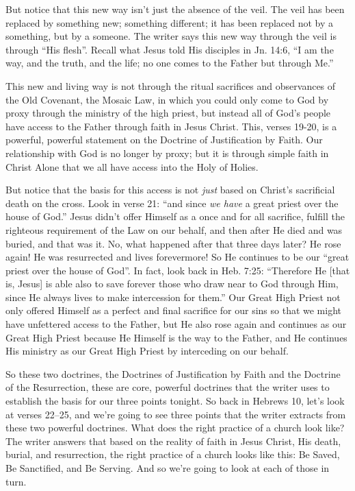 \documentclass[letterpaper, 12pt]{article}
\begin{document}
    But notice that this new way isn't just the absence of the veil. The
    veil has been replaced by something new; something different; it has
    been replaced not by a something, but by a someone. The writer says
    this new way through the veil is through ``His flesh''. Recall what
    Jesus told His disciples in Jn. 14:6, ``I am the way, and the truth,
    and the life; no one comes to the Father but through Me.''

    This new and living way is not through the ritual sacrifices and
    observances of the Old Covenant, the Mosaic Law, in which you could
    only come to God by proxy through the ministry of the high priest,
    but instead all of God's people have access to the Father through
    faith in Jesus Christ. This, verses 19-20, is a powerful, powerful
    statement on the Doctrine of Justification by Faith. Our
    relationship with God is no longer by proxy; but it is through
    simple faith in Christ Alone that we all have access into the Holy
    of Holies.

    But notice that the basis for this access is not \emph{just} based
    on Christ's sacrificial death on the cross. Look in verse 21: ``and
    since \emph{we have} a great priest over the house of God.'' Jesus
    didn't offer Himself as a once and for all sacrifice, fulfill the
    righteous requirement of the Law on our behalf, and then after He
    died and was buried, and that was it. No, what happened after that
    three days later? He rose again! He was resurrected and lives
    forevermore! So He continues to be our ``great priest over the house
    of God''. In fact, look back in Heb. 7:25: ``Therefore He [that is,
    Jesus] is able also to save forever those who draw near to God
    through Him, since He always lives to make intercession for them.''
    Our Great High Priest not only offered Himself as a perfect and
    final sacrifice for our sins so that we might have unfettered access
    to the Father, but He also rose again and continues as our Great
    High Priest because He Himself is the way to the Father, and He
    continues His ministry as our Great High Priest by interceding on
    our behalf.

    So these two doctrines, the Doctrines of Justification by Faith and
    the Doctrine of the Resurrection, these are core, powerful doctrines
    that the writer uses to establish the basis for our three points
    tonight. So back in Hebrews 10, let's look at verses 22--25, and
    we're going to see three points that the writer extracts from these
    two powerful doctrines. What does the right practice of a church
    look like? The writer answers that based on the reality of faith in
    Jesus Christ, His death, burial, and resurrection, the right
    practice of a church looks like this: Be Saved, Be Sanctified, and
    Be Serving. And so we're going to look at each of those in turn.
\end{document}
